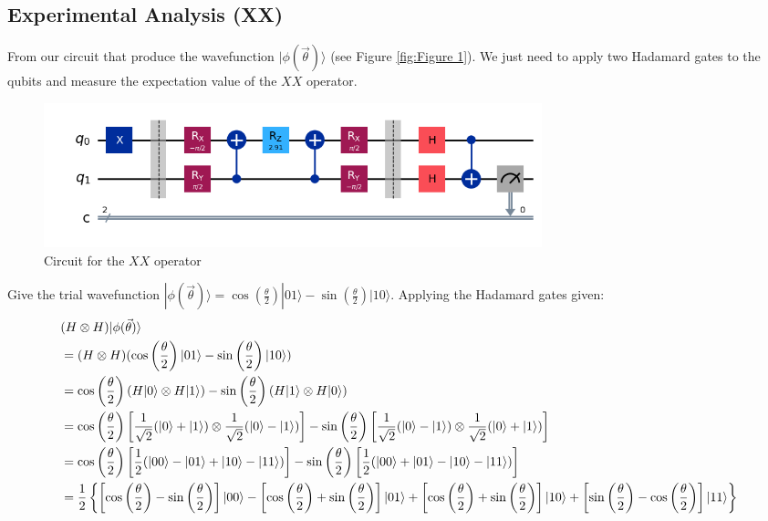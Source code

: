 \documentclass{article}
\begin{document}
\subsection{Experimental Analysis (XX)}
From our circuit that produce the wavefunction \(|\phi(\vec{\theta})\rangle\) (see Figure \ref{fig:Figure 1}). We just need to apply two Hadamard gates to the qubits and measure the expectation value of the \(XX\) operator.
\begin{figure}[H]
	\label{fig:Figure XX}
	\centering
	\includegraphics[width=0.7\textwidth, height=0.2\textheight]{XX.png}
	\caption{Circuit for the \(XX\) operator}
\end{figure}
\noindent Give the trial wavefunction \(|\phi(\vec{\theta})\rangle = \cos\left(\frac{\theta}{2}\right)|01\rangle - \sin\left(\frac{\theta}{2}\right)|10\rangle\). Applying the Hadamard gates given:
\begin{align*}
	&(H \otimes H)|\phi(\vec{\theta})\rangle  \\
	&= (H \otimes H)(\cos\left(\frac{\theta}{2}\right)|01\rangle - \sin\left(\frac{\theta}{2}\right)|10\rangle)                                                                                                                                                                            \\
	                                        & =  \cos\left(\frac{\theta}{2}\right)(H|0\rangle \otimes H|1\rangle) - \sin\left(\frac{\theta}{2}\right)(H|1\rangle \otimes H|0\rangle)                                                                                                                                                \\
	                                        & = \cos\left(\frac{\theta}{2}\right)\left[\frac{1}{\sqrt{2}}(|0\rangle+|1\rangle) \otimes \frac{1}{\sqrt{2}}(|0\rangle - |1\rangle)\right] - \sin\left(\frac{\theta}{2}\right)\left[\frac{1}{\sqrt{2}}(|0\rangle - |1\rangle) \otimes \frac{1}{\sqrt{2}}(|0\rangle + |1\rangle)\right] \\
	                                        & = \cos\left(\frac{\theta}{2}\right)\left[\frac{1}{2}(|00\rangle - |01\rangle + |10\rangle - |11\rangle)\right] - \sin\left(\frac{\theta}{2}\right)\left[\frac{1}{2}(|00\rangle + |01\rangle - |10\rangle - |11\rangle)\right] \\
											& = \frac{1}{2}\left\{\left[\cos\left(\frac{\theta}{2}\right) - \sin\left(\frac{\theta}{2}\right)\right]\ket{00} - \left[\cos\left(\frac{\theta}{2}\right) + \sin\left(\frac{\theta}{2}\right)\right] \ket{01} + \left[\cos\left(\frac{\theta}{2}\right) + \sin\left(\frac{\theta}{2}\right)\right] \ket{10} 
											+ \left[\sin\left(\frac{\theta}{2}\right)- \cos\left(\frac{\theta}{2}\right) \right]\ket{11} \right\} \\
\end{align*}
\end{document}
